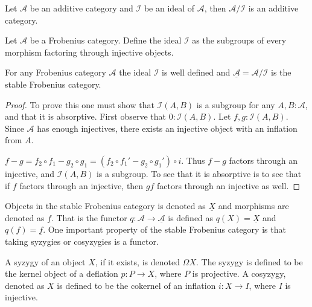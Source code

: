     \begin{corollary}
        Let $\mathcal{A}$ be an additive category and $\mathcal{I}$ be an ideal of $\mathcal{A}$, then $\mathcal{A}/\mathcal{I}$ is an additive category.
    \end{corollary}

    Let $\mathcal{A}$ be a Frobenius category. Define the ideal $\mathcal{I}$ as the subgroups of every morphism factoring through injective objects.

    \begin{prop}
        For any Frobenius category $\mathcal{A}$ the ideal $\mathcal{I}$ is well defined and $\underline{\mathcal{A}}=\mathcal{A}/\mathcal{I}$ is the stable Frobenius category.
    \end{prop}

    \begin{proof}
        To prove this one must show that $\mathcal{I}(A,B)$ is a subgroup for any $A,B:\mathcal{A}$, and that it is absorptive.
        First observe that $0:\mathcal{I}(A,B)$. Let $f,g:\mathcal{I}(A,B)$. Since $\mathcal{A}$ has enough injectives, there exists an injective object with an inflation from $A$.
        \begin{center}
        \end{center}
        $f-g = f_2 \circ f_1 - g_2 \circ g_1 = (f_2 \circ f_1' - g_2 \circ g_1') \circ i$. Thus $f-g$ factors through an injective, and $\mathcal{I}(A,B)$ is a subgroup.
        To see that it is absorptive is to see that if $f$ factors through an injective, then $gf$ factors through an injective as well.
    \end{proof}

    Objects in the stable Frobenius category is denoted as $\underline{X}$ and morphisms are denoted as $\underline{f}$. That is the functor $q:\mathcal{A}\rightarrow\underline{\mathcal{A}}$ is defined as $q(X)=\underline{X}$ and $q(f)=\underline{f}$. One important property of the stable Frobenius category is that taking syzygies or cosyzygies is a functor.

    \begin{definition}
        A syzygy of an object $X$, if it exists, is denoted $\Omega X$. The syzygy is defined to be the kernel object of a deflation $p:P\rightarrow X$, where $P$ is projective. A cosyzygy, denoted as \upside{$\Omega$}$X$ is defined to be the cokernel of an inflation $i:X\rightarrow I$, where $I$ is injective.
    \end{definition}

